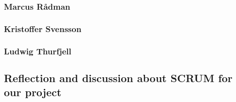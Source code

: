 \subsubsection{Marcus Rådman}
\subsubsection{Kristoffer Svensson}
\subsubsection{Ludwig Thurfjell}
\subsection{Reflection and discussion about SCRUM for our project}
